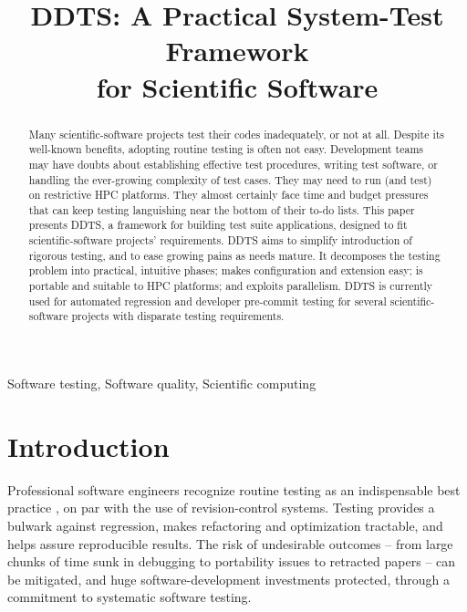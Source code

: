 \documentclass[conference]{IEEEtran}
\begin{document}
\thispagestyle{plain} %
\pagestyle{plain}     %
\title{DDTS: A Practical System-Test Framework\\for Scientific Software}
\author{
\and
{}
}
\maketitle
\begin{abstract}
Many scientific-software projects test their codes inadequately, or not at all. Despite its well-known benefits, adopting routine testing is often not easy. Development teams may have doubts about establishing effective test procedures, writing test software, or handling the ever-growing complexity of test cases. They may need to run (and test) on restrictive HPC platforms. They almost certainly face time and budget pressures that can keep testing languishing near the bottom of their to-do lists. This paper presents DDTS, a framework for building test suite applications, designed to fit scientific-software projects' requirements. DDTS aims to simplify introduction of rigorous testing, and to ease growing pains as needs mature. It decomposes the testing problem into practical, intuitive phases; makes configuration and extension easy; is portable and suitable to HPC platforms; and exploits parallelism. DDTS is currently used for automated regression and developer pre-commit testing for several scientific-software projects with disparate testing requirements.
\end{abstract}
\begin{keywords}
Software testing, Software quality, Scientific computing
\end{keywords}
\section{Introduction}
Professional software engineers recognize routine testing as an indispensable best practice \cite{prags}\cite{fowler-ci}\cite{extreme}\cite{batlab}, on par with the use of revision-control systems. Testing provides a bulwark against regression, makes refactoring and optimization tractable, and helps assure reproducible results. The risk of undesirable outcomes -- from large chunks of time sunk in debugging \cite{comp-sci-survey} to portability issues \cite{cig} to retracted papers \cite{does-not-compute} -- can be mitigated, and huge software-development investments protected, through a commitment to systematic software testing.
\end{document}
